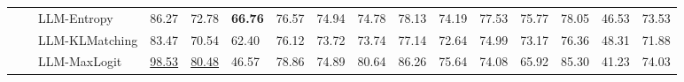 \begin{table}[ht!]
\begin{tabularx}{\textwidth}{@{}l l l |l *{11}{Y}|Y@{}}
 &  & LLM-Entropy & 86.27 & 72.78 & \textbf{66.76} & 76.57 & 74.94 & 74.78 & 78.13 & 74.19 & 77.53 & 75.77 & 78.05 & 46.53 & 73.53 \\
 &  & LLM-KLMatching & 83.47 & 70.54 & 62.40 & 76.12 & 73.72 & 73.74 & 77.14 & 72.64 & 74.99 & 73.17 & 76.36 & 48.31 & 71.88 \\
 &  & LLM-MaxLogit & \underline{98.53} & \underline{80.48} & 46.57 & 78.86 & 74.89 & 80.64 & 86.26 & 75.64 & 74.08 & 65.92 & 85.30 & 41.23 & 74.03 \\
\bottomrule
\end{tabularx}
\label{table::openset_LCR1}
\end{table}